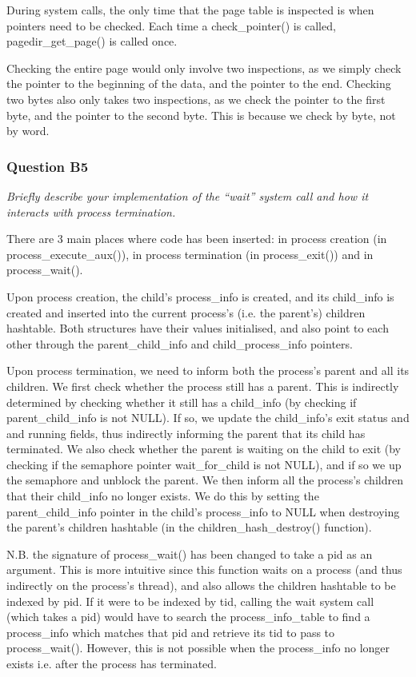 During system calls, the only time that the page table is inspected is when
pointers need to be checked.  Each time a check\_pointer() is called,
pagedir\_get\_page() is called once.

Checking the entire page would only involve two inspections, as we simply check
the pointer to the beginning of the data, and the pointer to the end.  Checking
two bytes also only takes two inspections, as we check the pointer to the first
byte, and the pointer to the second byte. This is because we check by byte, not
by word.

\subsubsection*{Question B5} %
\textit{Briefly describe your implementation of the ``wait'' system call and how it interacts with process termination.}

There are 3 main places where code has been inserted: in process creation (in process\_execute\_aux()), in process termination (in process\_exit()) and in process\_wait().

Upon process creation, the child's process\_info is created, and its child\_info is created and inserted into the current process's (i.e. the parent's) children hashtable. Both structures have their values initialised, and also point to each other through the parent\_child\_info and child\_process\_info pointers.

Upon process termination, we need to inform both the process's parent and all its children. We first check whether the process still has a parent. This is indirectly determined by checking whether it still has a child\_info (by checking if parent\_child\_info is not NULL). If so, we update the child\_info's exit status and and running fields, thus indirectly informing the parent that its child has terminated. We also check whether the parent is waiting on the child to exit (by checking if the semaphore pointer wait\_for\_child is not NULL), and if so we up the semaphore and unblock the parent. We then inform all the process's children that their child\_info no longer exists. We do this by setting the parent\_child\_info pointer in the child's process\_info to NULL when destroying the parent's children hashtable (in the children\_hash\_destroy() function).

N.B. the signature of process\_wait() has been changed to take a pid as an argument. This is more intuitive since this function waits on a process (and thus indirectly on the process's thread), and also allows the children hashtable to be indexed by pid. If it were to be indexed by tid, calling the wait system call (which takes a pid) would have to search the process\_info\_table to find a process\_info which matches that pid and retrieve its tid to pass to process\_wait(). However, this is not possible when the process\_info no longer exists i.e. after the process has terminated.


